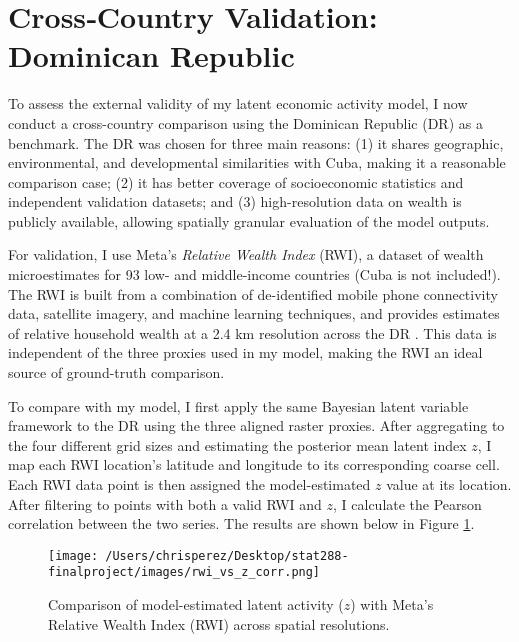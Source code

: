 \documentclass[12pt]{article}
\begin{document}
  
  
  
  
  
  
  
\section{Cross‑Country Validation: Dominican Republic}
\label{sec:validation}

To assess the external validity of my latent economic activity model, I now conduct a cross-country comparison using the Dominican Republic (DR) as a benchmark. The DR was chosen for three main reasons: (1) it shares geographic, environmental, and developmental similarities with Cuba, making it a reasonable comparison case; (2) it has better coverage of socioeconomic statistics and independent validation datasets; and (3) high-resolution data on wealth is publicly available, allowing spatially granular evaluation of the model outputs.

For validation, I use Meta's \textit{Relative Wealth Index} (RWI), a dataset of wealth microestimates for 93 low- and middle-income countries (Cuba is not included!). The RWI is built from a combination of de-identified mobile phone connectivity data, satellite imagery, and machine learning techniques, and provides estimates of relative household wealth at a 2.4 km resolution across the DR \parencite{chi2022microestimates}. This data is independent of the three proxies used in my model, making the RWI an ideal source of ground-truth comparison.

To compare with my model, I first apply the same Bayesian latent variable framework to the DR using the three aligned raster proxies. After aggregating to the four different grid sizes and estimating the posterior mean latent index \( z \), I map each RWI location's latitude and longitude to its corresponding coarse cell. Each RWI data point is then assigned the model-estimated \( z \) value at its location. After filtering to points with both a valid RWI and \( z \), I calculate the Pearson correlation between the two series. The results are shown below in Figure \ref{fig:rwi_validation}.

\begin{figure}[H]
  \centering
  \texttt{[image: /Users/chrisperez/Desktop/stat288-finalproject/images/rwi\_vs\_z\_corr.png]}
  \caption{Comparison of model-estimated latent activity ($z$) with Meta’s Relative Wealth Index (RWI) across spatial resolutions.}
  \label{fig:rwi_validation}
\end{figure}
\end{document}
